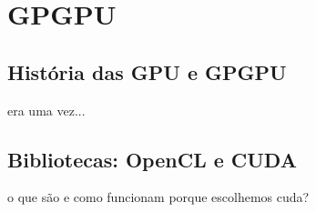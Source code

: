 \chapter{GPGPU}
\label{cap:gpgpu}

\section{História das GPU e GPGPU}
  era uma vez...

\section{Bibliotecas: OpenCL e CUDA}
  o que são e como funcionam
  porque escolhemos cuda?
